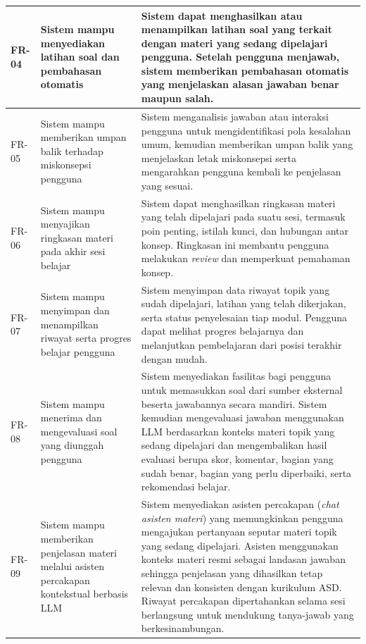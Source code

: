 \begin{longtable}{|L{1.8cm}|L{3cm}|L{7.5cm}|}
FR-04 & Sistem mampu menyediakan latihan soal dan pembahasan otomatis &
Sistem dapat menghasilkan atau menampilkan latihan soal yang terkait dengan materi yang sedang dipelajari pengguna. Setelah pengguna menjawab, sistem memberikan pembahasan otomatis yang menjelaskan alasan jawaban benar maupun salah. \\
\hline

FR-05 & Sistem mampu memberikan umpan balik terhadap miskonsepsi pengguna &
Sistem menganalisis jawaban atau interaksi pengguna untuk mengidentifikasi pola kesalahan umum, kemudian memberikan umpan balik yang menjelaskan letak miskonsepsi serta mengarahkan pengguna kembali ke penjelasan yang sesuai. \\
\hline

FR-06 & Sistem mampu menyajikan ringkasan materi pada akhir sesi belajar &
Sistem dapat menghasilkan ringkasan materi yang telah dipelajari pada suatu sesi, termasuk poin penting, istilah kunci, dan hubungan antar konsep. Ringkasan ini membantu pengguna melakukan \textit{review} dan memperkuat pemahaman konsep. \\
\hline

FR-07 & Sistem mampu menyimpan dan menampilkan riwayat serta progres belajar pengguna &
Sistem menyimpan data riwayat topik yang sudah dipelajari, latihan yang telah dikerjakan, serta status penyelesaian tiap modul. Pengguna dapat melihat progres belajarnya dan melanjutkan pembelajaran dari posisi terakhir dengan mudah. \\
\hline

FR-08 & Sistem mampu menerima dan mengevaluasi soal yang diunggah pengguna &
Sistem menyediakan fasilitas bagi pengguna untuk memasukkan soal dari sumber eksternal beserta jawabannya secara mandiri. Sistem kemudian mengevaluasi jawaban menggunakan LLM berdasarkan konteks materi topik yang sedang dipelajari dan mengembalikan hasil evaluasi berupa skor, komentar, bagian yang sudah benar, bagian yang perlu diperbaiki, serta rekomendasi belajar. \\
\hline

FR-09 & Sistem mampu memberikan penjelasan materi melalui asisten percakapan kontekstual berbasis LLM &
Sistem menyediakan asisten percakapan (\textit{chat asisten materi}) yang memungkinkan pengguna mengajukan pertanyaan seputar materi topik yang sedang dipelajari. Asisten menggunakan konteks materi resmi sebagai landasan jawaban sehingga penjelasan yang dihasilkan tetap relevan dan konsisten dengan kurikulum ASD. Riwayat percakapan dipertahankan selama sesi berlangsung untuk mendukung tanya-jawab yang berkesinambungan. \\
\hline

\end{longtable}

